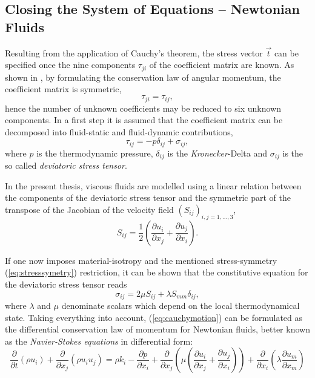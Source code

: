 \subsection{Closing the System of Equations -- Newtonian Fluids}
\label{sec:fundclosing}

Resulting from the application of Cauchy's theorem, the stress vector \( \vec{t} \) can be specified once the nine components \(\tau_{ji}\) of the coefficient matrix are known. As shown in \cite{kundu12,spurk10}, by formulating the conservation law of angular momentum, the coefficient matrix is symmetric, 
\begin{equation}
  \label{eq:stresssymetry}
  \tau_{ji} = \tau_{ij},
\end{equation}
hence the number of unknown coefficients may be reduced to six unknown components. In a first step it is assumed that the coefficient matrix can be decomposed into fluid-static and fluid-dynamic contributions,
\begin{displaymath}
  \tau_{ij} = -p \delta_{ij} + \sigma_{ij},
\end{displaymath}
where \(p\) is the thermodynamic pressure, \(\delta_{ij}\) is the \emph{Kronecker}-Delta and \( \sigma_{ij} \) is the so called \emph{deviatoric stress tensor}. 
    
In the present thesis, viscous fluids are modelled using a linear relation between the components of the deviatoric stress tensor and the symmetric part of the transpose of the Jacobian of the velocity field \(\left( S_{ij} \right)_{i,j=1,\dots,3}\),
\begin{displaymath}
  S_{ij} = \frac{1}{2} \left( \frac{\partial u_i}{\partial x_j} + \frac{\partial u_j}{\partial x_i} \right).
\end{displaymath}

If one now imposes material-isotropy and the mentioned stress-symmetry (\ref{eq:stresssymetry}) restriction, it can be shown \cite{aris62} that the constitutive equation for the deviatoric stress tensor reads 
\begin{displaymath}
  \sigma_{ij} = 2 \mu S_{ij} + \lambda S_{mm} \delta_{ij},
\end{displaymath}
where \(\lambda\) and \(\mu\) denominate scalars which depend on the local thermodynamical state. Taking everything into account, (\ref{eq:cauchymotion}) can be formulated as the differential conservation law of momentum for Newtonian fluids, better known as the \emph{Navier-Stokes equations} in differential form:
\begin{equation}
\label{eq:nsfull}
\frac{\partial }{\partial t} \left(\rho u_i \right)
+ \frac{\partial}{\partial x_j} \left( \rho u_i  u_j \right) 
= \rho k_i
- \frac{\partial p}{\partial x_i}
+ \frac{\partial}{\partial x_j} \left( \mu  \left( \frac{\partial u_i}{\partial x_j} 
                                        + \frac{\partial u_j}{\partial x_i} \right) \right)
+ \frac{\partial}{\partial x_i} \left(\lambda \frac{\partial u_m}{\partial x_m} \right)
\end{equation}

